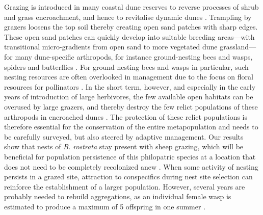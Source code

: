 \documentclass[10pt, twoside]{book} %
\begin{document}
	Grazing is introduced in many coastal dune reserves to reverse processes of shrub and grass encroachment, and hence to revitalise dynamic dunes \citep{provoost2004}. Trampling by grazers loosens the top soil thereby creating open sand patches with sharp edges. These open sand patches can quickly develop into suitable breeding areas---with transitional micro-gradients from open sand to more vegetated dune grassland---for many dune-specific arthropods, for instance ground-nesting bees and wasps, spiders and butterflies \citep{wallisdevries2001, vanklink2015}. For ground nesting bees and wasps in particular, such nesting resources are often overlooked in management due to the focus on floral resources for pollinators \citep{kimoto2012, buckles2019}. In the short term, however, and especially in the early years of introduction of large herbivores, the few available open habitats can be overused by large grazers, and thereby destroy the few relict populations of these arthropods in encroached dunes \citep{bonte2005, vanklink2015}. The protection of these relict populations is therefore essential for the conservation of the entire metapopulation \citep{bonte2008} and needs to be carefully surveyed, but also steered by adaptive management. Our results show that nests of \textit{B. rostrata} stay present with sheep grazing, which will be beneficial for population persistence of this philopatric species at a location that does not need to be completely recolonized anew \citep{blosch2000, bogusch2021}. When some activity of nesting persists in a grazed site, attraction to conspecifics during nest site selection \citep[chapter \ref{chapter2}][]{batsleer2022} can reinforce the establishment of a larger population. However, several years are probably needed to rebuild aggregations, as an individual female wasp is estimated to produce a maximum of 5 offspring in one summer \citep{larsson1989}.\\
	
\end{document}
